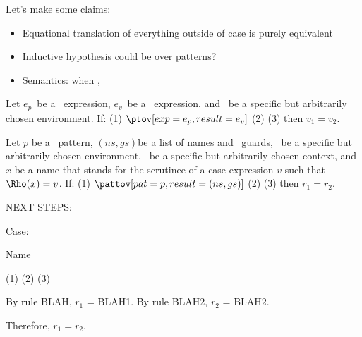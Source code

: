 \documentclass[]{article}
\begin{document}
Let's make some claims: 

\begin{itemize}
    \item Equational translation of everything outside of case is purely equivalent 
    \item Inductive hypothesis could be over patterns? 
    \item Semantics: when \prun, \vmrung
\end{itemize}

\newcommand\translatesto\rightsquigarrow

\newcommand\ep{\ensuremath{e_{p}}}
\newcommand\ev{\ensuremath{e_{v}}}
\newcommand\nsgs{\ensuremath{(ns, gs)}}


Let \ep\ be a \PPlus\ expression, \ev\ be a \VMinus\ expression, and \Rho\
be a specific but arbitrarily chosen environment. If: (1) $\ptov[exp=\ep, result=\ev]$
(2) \prun[exp=\ep, value=v_{1}] (3) \vmrung[guard=\ev, result=v_{2}]
then $v_{1} = v_{2}$.

Let $p$ be a \PPlus\ pattern, \nsgs be a list of names and \VMinus\ guards,
\Rho\ be a specific but arbitrarily chosen environment, \context\ be a specific
but arbitrarily chosen context, and $x$ be a name that stands for the scrutinee
of a case expression $v$ such that $\Rho(x) = v$. If: (1) $\pattov[pat=p,
result=\nsgs]$ (2) \pmatch[newenv=r_{1}] (3)
\doguards[result=r_{2}] then $r_{1} = r_{2}$.


NEXT STEPS:


Case: 

Name 

(1) \pattov[pat=y, result={(y, [x = y])}] (2) \pmatch[pat=y, newenv=r_{1}] (3) \doguards[envext=\bracketed{y \mapsto \rho(x)}, guards={[x = y]}, result=r_{2}]

By rule BLAH, $r_{1}$ = BLAH1. 
By rule BLAH2, $r_{2}$ = BLAH2. 

Therefore, $r_{1} = r_{2}$. 
\end{document}
